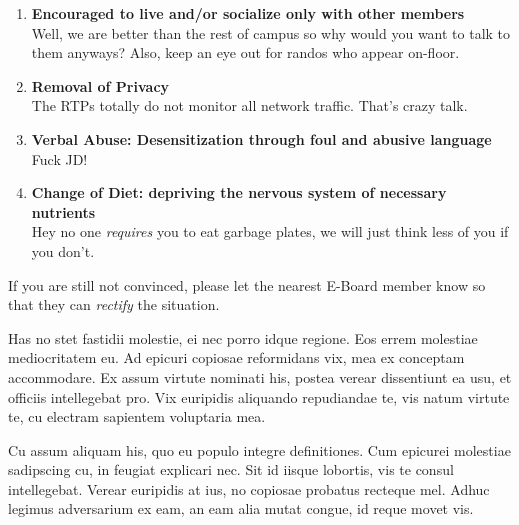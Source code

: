 \documentclass[9pt]{extarticle} %
\begin{document}
\begin{minipage}[t]{.61\linewidth}
\begin{enumerate}
\item \textbf{Encouraged to live and/or socialize only with other members} \\
Well, we are better than the rest of campus so why would you want to talk to
them anyways? Also, keep an eye out for randos who appear on-floor. 

\item \textbf{Removal of Privacy} \\
The RTPs totally do not monitor all network traffic. That's crazy talk. 

\item \textbf{Verbal Abuse: Desensitization through foul and abusive language} \\
Fuck JD!

\item \textbf{Change of Diet: depriving the nervous system of necessary 
nutrients} \\
Hey no one \textit{requires} you to eat garbage plates, we will just think less
of you if you don't.


\end{enumerate}

If you are still not convinced, please let the nearest E-Board member know so
that they can \textit{rectify} the situation. 


\hypertarget{secondnews}{} 

Has no stet fastidii molestie, ei nec porro idque regione. Eos errem molestiae mediocritatem eu. Ad epicuri copiosae reformidans vix, mea ex conceptam accommodare. Ex assum virtute nominati his, postea verear dissentiunt ea usu, et officiis intellegebat pro. Vix euripidis aliquando repudiandae te, vis natum virtute te, cu electram sapientem voluptaria mea.

Cu assum aliquam his, quo eu populo integre definitiones. Cum epicurei molestiae sadipscing cu, in feugiat explicari nec. Sit id iisque lobortis, vis te consul intellegebat. Verear euripidis at ius, no copiosae probatus recteque mel. Adhuc legimus adversarium ex eam, an eam alia mutat congue, id reque movet vis.


\end{minipage} %
\end{document}
